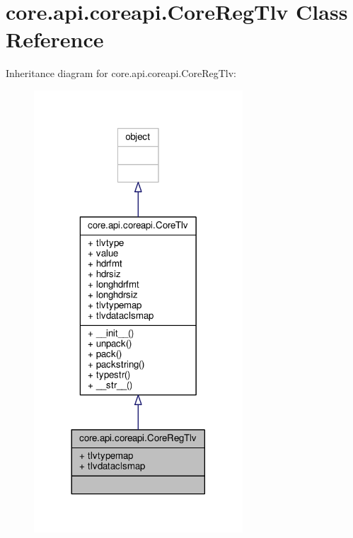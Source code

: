 \hypertarget{classcore_1_1api_1_1coreapi_1_1_core_reg_tlv}{\section{core.\+api.\+coreapi.\+Core\+Reg\+Tlv Class Reference}
\label{classcore_1_1api_1_1coreapi_1_1_core_reg_tlv}
}


Inheritance diagram for core.\+api.\+coreapi.\+Core\+Reg\+Tlv\+:
\nopagebreak
\begin{figure}[H]
\begin{center}
\leavevmode
\includegraphics[width=221pt]{classcore_1_1api_1_1coreapi_1_1_core_reg_tlv__inherit__graph}
\end{center}
\end{figure}


